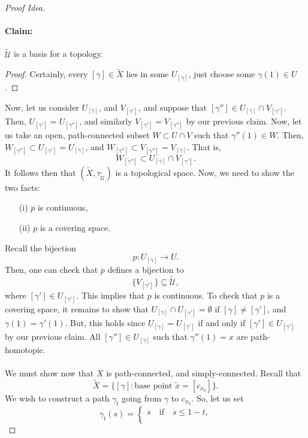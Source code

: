 \documentclass[a4paper]{report}
\theoremstyle{definition}
\theoremstyle{remark}
\theoremstyle{proposition}
\theoremstyle{conjecture}
\theoremstyle{lemma}
\theoremstyle{corollary}
\theoremstyle{exercise}
\newcommand{\mcal}{\mathcal}
\begin{document}
\begin{proof}[Proof Idea]
    \paragraph{Claim:} $\widetilde{\mcal{U}}$ is a basis for a topology.
    \begin{proof}
        Certainly, every $[\gamma] \in \widetilde{X}$ lies in some $U_{[\gamma]}$,
        just choose some $\gamma(1) \in U$. 
    \end{proof}
    Now, let us consider $U_{[\gamma]}$,
    and $V_{[\gamma']}$, and suppose that 
    $[\gamma''] \in U_{[\gamma]} \cap V_{[\gamma']}$. Then, $U_{[\gamma']} = U_{[\gamma'']}$,
    and similarly $V_{[\gamma']} = V_{[\gamma'']}$ by our previous claim. 
    Now, let us take an open, path-connected subset $W \subset U \cap V$ such that 
    $\gamma''(1) \in W$.
    Then, $W_{[\gamma'']} \subset U_{[\gamma']} = U_{[\gamma]}$, and $W_{[\gamma'']} \subset V_{[\gamma'']} = V_{[\gamma]}$.
    That is, 
    $$W_{[\gamma'']} \subset U_{[\gamma]} \cap V_{[\gamma']}.$$ 
    It follows then that $(\widetilde{X}, \tau_{\widetilde{\mcal{U}}})$ is a topological space.
    Now, we need to show the two facts:
    \begin{itemize}
        \item[(i)] $p$ is continuous, 
        \item[(ii)] $p$ is a covering space.
    \end{itemize}
    Recall the bijection $$p : U_{[\gamma]} \longrightarrow U.$$
    Then, one can check that $p$ defines a bijection to 
    $$\lbrace V_{[\gamma']} \rbrace \subseteq \widetilde{\mcal{U}},$$ 
    where $[\gamma'] \in U_{[\gamma']}$. This implies that $p$ is continuous. 
    To check that $p$ is a covering space, it remains to show that 
    $U_{[\gamma]} \cap U_{[\gamma']} = \emptyset$ if $[\gamma] \neq [\gamma']$,
    and $\gamma(1) = \gamma'(1)$. But, this holds since $U_{[\gamma]} = U_{[\gamma']}$ 
    if and only if $[\gamma'] \in U_{[\gamma']}$ by our previous claim. All 
    $[\gamma''] \in U_{[\gamma]}$ such that $\gamma''(1) = x$ are 
    path-homotopic.\\\\
    We must show now that $X$ is path-connected, and simply-connected. Recall that 
    $$\widetilde{X} = \lbrace [\gamma] : \text{base point $\widetilde{x} = [c_{x_0}]$}\rbrace.$$
    We wish to construct a path $\gamma_t$ going from $\gamma$ to $c_{x_0}$.
    So, let us set 
    $$\gamma_t(s) = \begin{cases}
        s \quad \text{if} \quad s \leq 1-t,\\

\end{cases}$$
\end{proof}
\end{document}
